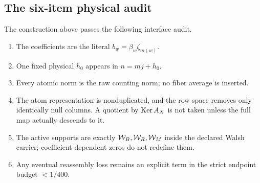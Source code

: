 \subsection{The six-item physical audit}

The construction above passes the following interface audit.
\begin{enumerate}[leftmargin=2.2em]
 \item The coefficients are the literal \(b_w=\beta_w\zeta_{m(w)}\).
 \item One fixed physical \(h_0\) appears in \(n=mj+h_0\).
 \item Every atomic norm is the raw counting norm; no fiber average is
       inserted.
 \item The atom representation is nonduplicated, and the row space removes
       only identically null columns.  A quotient by \(\operatorname{Ker} A_X\) is not
       taken unless the full map actually descends to it.
 \item The active supports are exactly \(\mathcal W_B,\mathcal W_R,\mathcal W_M\) inside the
       declared Walsh carrier; coefficient-dependent zeros do not redefine
       them.
 \item Any eventual reassembly loss remains an explicit term in the strict
       endpoint budget \(<1/400\).
\end{enumerate}

